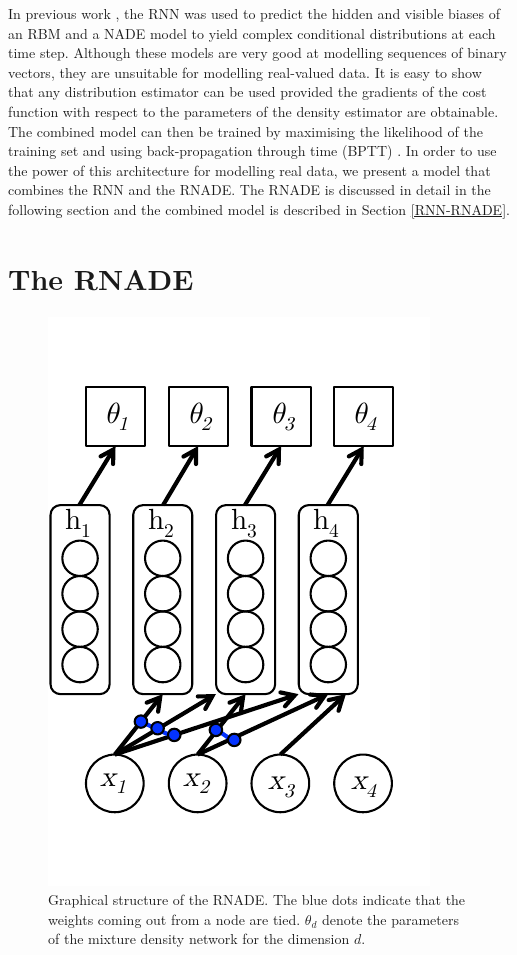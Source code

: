 \documentclass{article} %
\begin{document}
In previous work \cite{Boulanger-Lewandowski2012}, the RNN was used to predict the hidden and visible biases of an RBM and a NADE model to yield complex conditional distributions at each time step. Although these models are very good at modelling sequences of binary vectors, they are unsuitable for modelling real-valued data. It is easy to show that any distribution estimator can be used provided the gradients of the cost function with respect to the parameters of the density estimator are obtainable. The combined model can then be trained by maximising the likelihood of the training set and using back-propagation through time (BPTT) \cite{rumelhart1985learning}. In order to use the power of this architecture for modelling real data, we present a model that combines the RNN and the RNADE. The RNADE is discussed in detail in the following section and the combined model is described in Section \ref{RNN-RNADE}. 

\section{The RNADE}
\label{RNADE}
\begin{figure}
        \centering
    \includegraphics[scale=0.7]{RNADE.pdf}
    \caption{
Graphical structure of the RNADE. The blue dots indicate that the weights coming out from a node are tied. $\theta_{d}$ denote the parameters of the mixture density network for the dimension $d$. }
    \label{fig:rnn-rnade}
\end{figure}
\end{document}

